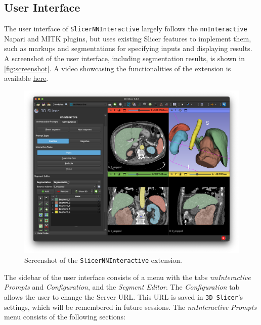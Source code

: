 \documentclass[
]{article}
\begin{document}
\subsection{User Interface}\label{user-interface}

The user interface of \texttt{SlicerNNInteractive} largely follows the
\texttt{nnInteractive} Napari and MITK plugins, but uses existing Slicer
features to implement them, such as markups and segmentations for
specifying inputs and displaying results. A screenshot of the user
interface, including segmentation results, is shown in
\autoref{fig:screenshot}. A video showcasing the functionalities of the
extension is available
\href{https://www.youtube.com/watch?v=mW_fUT1-IWM}{here}.

\begin{figure}
\centering
\includegraphics{img/screenshot.png}
\caption{Screenshot of the \texttt{SlicerNNInteractive}
extension.\label{fig:screenshot}}
\end{figure}

The sidebar of the user interface consists of a menu with the tabs
\emph{nnInteractive Prompts} and \emph{Configuration}, and the
\emph{Segment Editor}. The \emph{Configuration} tab allows the user to
change the Server URL. This URL is saved in \texttt{3D\ Slicer}'s
settings, which will be remembered in future sessions. The
\emph{nnInteractive Prompts} menu consists of the following sections:
\end{document}
